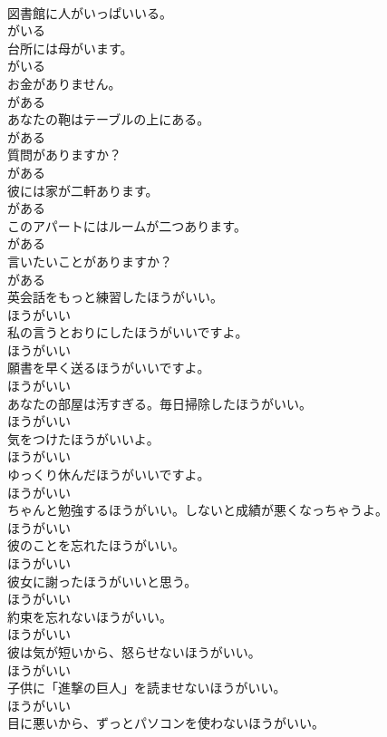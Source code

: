 \documentclass[8pt]{extreport}
\begin{document}
\begin{CJK}{UTF8}{min}
\\	図書館に人がいっぱいいる。	
\\	がいる
\\	台所には母がいます。	
\\	がいる
\\	お金がありません。	
\\	がある
\\	あなたの鞄はテーブルの上にある。	
\\	がある
\\	質問がありますか？	
\\	がある
\\	彼には家が二軒あります。	
\\	がある
\\	このアパートにはルームが二つあります。	
\\	がある
\\	言いたいことがありますか？	
\\	がある
\\	英会話をもっと練習したほうがいい。	
\\	ほうがいい
\\	私の言うとおりにしたほうがいいですよ。	
\\	ほうがいい
\\	願書を早く送るほうがいいですよ。	
\\	ほうがいい
\\	あなたの部屋は汚すぎる。毎日掃除したほうがいい。	
\\	ほうがいい
\\	気をつけたほうがいいよ。	
\\	ほうがいい
\\	ゆっくり休んだほうがいいですよ。	
\\	ほうがいい
\\	ちゃんと勉強するほうがいい。しないと成績が悪くなっちゃうよ。	
\\	ほうがいい
\\	彼のことを忘れたほうがいい。	
\\	ほうがいい
\\	彼女に謝ったほうがいいと思う。	
\\	ほうがいい
\\	約束を忘れないほうがいい。	
\\	ほうがいい
\\	彼は気が短いから、怒らせないほうがいい。	
\\	ほうがいい
\\	子供に「進撃の巨人」を読ませないほうがいい。	
\\	ほうがいい
\\	目に悪いから、ずっとパソコンを使わないほうがいい。	

\end{CJK}
\end{document}
